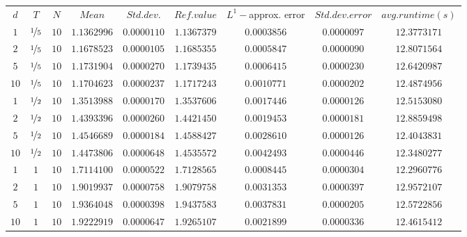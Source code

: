\begin{tabular}{ccccccccc}
$d$ & $T$ & $N$ & $Mean$ & $Std. dev.$ & $Ref. value$ & $L^1-$approx. error & $Std. dev. error$ & $avg. runtime (s)$\\
$1$ & $\nicefrac{1}{5}$ & $10$ & $1.1362996$ & $0.0000110$ & $1.1367379$ & $0.0003856$ & $0.0000097$ & $12.3773171$\\
$2$ & $\nicefrac{1}{5}$ & $10$ & $1.1678523$ & $0.0000105$ & $1.1685355$ & $0.0005847$ & $0.0000090$ & $12.8071564$\\
$5$ & $\nicefrac{1}{5}$ & $10$ & $1.1731904$ & $0.0000270$ & $1.1739435$ & $0.0006415$ & $0.0000230$ & $12.6420987$\\
$10$ & $\nicefrac{1}{5}$ & $10$ & $1.1704623$ & $0.0000237$ & $1.1717243$ & $0.0010771$ & $0.0000202$ & $12.4874956$\\
$1$ & $\nicefrac{1}{2}$ & $10$ & $1.3513988$ & $0.0000170$ & $1.3537606$ & $0.0017446$ & $0.0000126$ & $12.5153080$\\
$2$ & $\nicefrac{1}{2}$ & $10$ & $1.4393396$ & $0.0000260$ & $1.4421450$ & $0.0019453$ & $0.0000181$ & $12.8859498$\\
$5$ & $\nicefrac{1}{2}$ & $10$ & $1.4546689$ & $0.0000184$ & $1.4588427$ & $0.0028610$ & $0.0000126$ & $12.4043831$\\
$10$ & $\nicefrac{1}{2}$ & $10$ & $1.4473806$ & $0.0000648$ & $1.4535572$ & $0.0042493$ & $0.0000446$ & $12.3480277$\\
$1$ & $1$ & $10$ & $1.7114100$ & $0.0000522$ & $1.7128565$ & $0.0008445$ & $0.0000304$ & $12.2960776$\\
$2$ & $1$ & $10$ & $1.9019937$ & $0.0000758$ & $1.9079758$ & $0.0031353$ & $0.0000397$ & $12.9572107$\\
$5$ & $1$ & $10$ & $1.9364048$ & $0.0000398$ & $1.9437583$ & $0.0037831$ & $0.0000205$ & $12.5722856$\\
$10$ & $1$ & $10$ & $1.9222919$ & $0.0000647$ & $1.9265107$ & $0.0021899$ & $0.0000336$ & $12.4615412$\\
\end{tabular}
